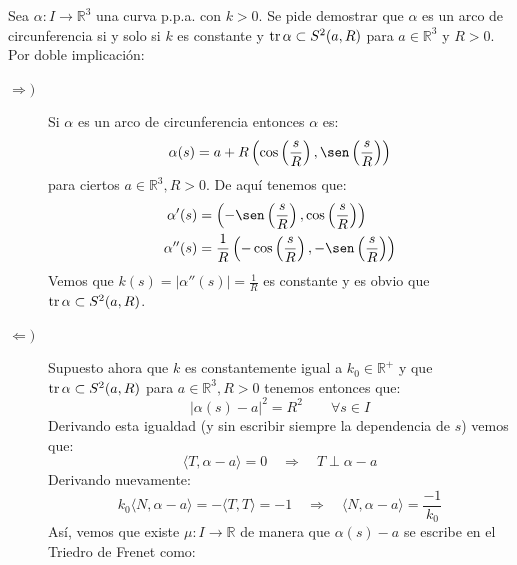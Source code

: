 \begin{ejercicio}
    Sea $\alpha:I\to\mathbb{R}^3$ una curva p.p.a. con $k>0$. Se pide demostrar que $\alpha$ es un arco de circunferencia si y solo si $k$ es constante y $\operatorname{tr}\alpha\subset S^2(a,R)$ para $a\in \mathbb{R}^3$ y $R>0$.\\

    \noindent
    Por doble implicación:
    \begin{description}
        \item [$\Longrightarrow )$] Si $\alpha$ es un arco de circunferencia entonces $\alpha$ es:
            \begin{equation*}
                \alpha(s) = a + R\left(\cos\left(\frac{s}{R}\right),\sen\left(\frac{s}{R}\right)\right)
            \end{equation*}
            para ciertos $a\in \mathbb{R}^3,R>0$. De aquí tenemos que:
            \begin{align*}
                \alpha'(s) &= \left(-\sen\left(\frac{s}{R}\right),\cos\left(\frac{s}{R}\right)\right) \\
                \alpha''(s) &= \frac{1}{R}\left(-\cos\left(\frac{s}{R}\right),-\sen\left(\frac{s}{R}\right)\right)
            \end{align*}
            Vemos que $k(s) = |\alpha''(s)| = \frac{1}{R}$ es constante y es obvio que $\operatorname{tr}\alpha\subset S^2(a,R)$.
        \item [$\Longleftarrow )$] Supuesto ahora que $k$ es constantemente igual a $k_0\in \mathbb{R}^+$ y que $\operatorname{tr}\alpha\subset S^2(a,R)$ para $a\in \mathbb{R}^3,R>0$ tenemos entonces que:
            \begin{equation*}
                |\alpha(s)-a|^2 = R^2 \qquad \forall s\in I
            \end{equation*}
            Derivando esta igualdad (y sin escribir siempre la dependencia de $s$) vemos que:
            \begin{equation*}
                \langle T,\alpha-a \rangle = 0 \quad\Longrightarrow\quad T \perp \alpha-a
            \end{equation*}
            Derivando nuevamente:
            \begin{equation*}
                k_0\langle N,\alpha-a \rangle = -\langle T,T \rangle = -1 \quad\Longrightarrow\quad \langle N,\alpha-a \rangle = \frac{-1}{k_0}
            \end{equation*}
            Así, vemos que existe $\mu:I\to \mathbb{R}$ de manera que $\alpha(s)-a$ se escribe en el Triedro de Frenet como:

\end{description}
\end{ejercicio}
